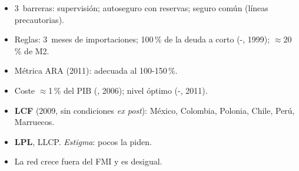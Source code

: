 \documentclass{article}
\begin{document}
\begin{columnas}
\begin{itemize}
\item 3~barreras: supervisión; autoseguro con reservas; seguro común (líneas precautorias).
\end{itemize}
\begin{itemize}
\item Reglas: 3~meses de importaciones; 100\,\% de la deuda a corto (-, 1999); $\approx$20\,\% de M2.
\item Métrica ARA (2011): adecuada al 100-150\,\%.
\item Coste $\approx$1\,\% del PIB (, 2006); nivel óptimo (-, 2011).
\end{itemize}
\begin{itemize}
\item \textbf{LCF} (2009, sin condiciones \emph{ex post}): México, Colombia, Polonia, Chile, Perú, Marruecos.
\item \textbf{LPL}, LLCP. \emph{Estigma}: pocos la piden.
\item La red crece fuera del FMI y es desigual.
\end{itemize}


\end{columnas}
\end{document}
